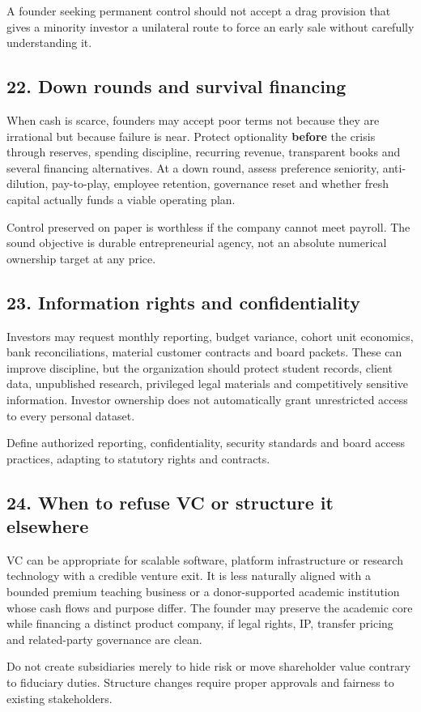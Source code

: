 A founder seeking permanent control should not accept a drag provision that gives a minority investor a unilateral route to force an early sale without carefully understanding it.

\subsection{22. Down rounds and survival financing}

When cash is scarce, founders may accept poor terms not because they are irrational but because failure is near. Protect optionality \textbf{before} the crisis through reserves, spending discipline, recurring revenue, transparent books and several financing alternatives. At a down round, assess preference seniority, anti-dilution, pay-to-play, employee retention, governance reset and whether fresh capital actually funds a viable operating plan.

Control preserved on paper is worthless if the company cannot meet payroll. The sound objective is durable entrepreneurial agency, not an absolute numerical ownership target at any price.

\subsection{23. Information rights and confidentiality}

Investors may request monthly reporting, budget variance, cohort unit economics, bank reconciliations, material customer contracts and board packets. These can improve discipline, but the organization should protect student records, client data, unpublished research, privileged legal materials and competitively sensitive information. Investor ownership does not automatically grant unrestricted access to every personal dataset.

Define authorized reporting, confidentiality, security standards and board access practices, adapting to statutory rights and contracts.

\subsection{24. When to refuse VC or structure it elsewhere}

VC can be appropriate for scalable software, platform infrastructure or research technology with a credible venture exit. It is less naturally aligned with a bounded premium teaching business or a donor-supported academic institution whose cash flows and purpose differ. The founder may preserve the academic core while financing a distinct product company, if legal rights, IP, transfer pricing and related-party governance are clean.

Do not create subsidiaries merely to hide risk or move shareholder value contrary to fiduciary duties. Structure changes require proper approvals and fairness to existing stakeholders.
